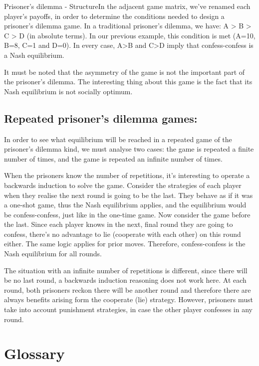 \documentclass[]{report}
\begin{document}
Prisoner's dilemma - StructureIn the adjacent game matrix, we’ve renamed each player’s payoffs, in order to determine the conditions needed to design a prisoner’s dilemma game. In a traditional prisoner’s dilemma, we have: A > B > C > D (in absolute terms). In our previous example, this condition is met (A=10, B=8, C=1 and D=0). In every case, A>B and C>D imply that confess-confess is a Nash equilibrium.

It must be noted that the asymmetry of the game is not the important part of the prisoner’s dilemma. The interesting thing about this game is the fact that its Nash equilibrium is not socially optimum.



\subsection{Repeated prisoner’s dilemma games:}

In order to see what equilibrium will be reached in a repeated game of the prisoner’s dilemma kind, we must analyse two cases: the game is repeated a finite number of times, and the game is repeated an infinite number of times.

When the prisoners know the number of repetitions, it’s interesting to operate a backwards induction to solve the game. Consider the strategies of each player when they realise the next round is going to be the last. They behave as if it was a one-shot game, thus the Nash equilibrium applies, and the equilibrium would be confess-confess, just like in the one-time game. Now consider the game before the last. Since each player knows in the next, final round they are going to confess, there’s no advantage to lie (cooperate with each other) on this round either. The same logic applies for prior moves. Therefore, confess-confess is the Nash equilibrium for all rounds.

The situation with an infinite number of repetitions is different, since there will be no last round, a backwards induction reasoning does not work here. At each round, both prisoners reckon there will be another round and therefore there are always benefits arising form the cooperate (lie) strategy. However, prisoners must take into account punishment strategies, in case the other player confesses in any round.


\section{Glossary}
\end{document}
